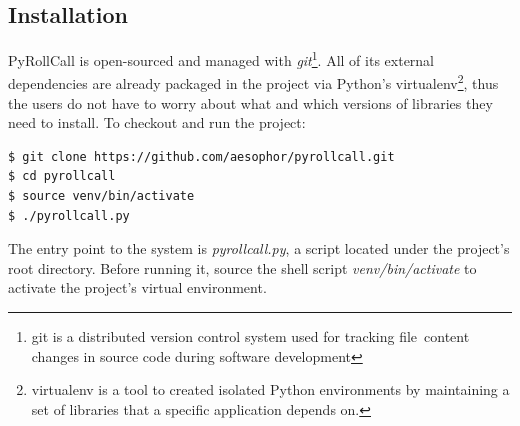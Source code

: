 \subsection{Installation}
PyRollCall is open-sourced and managed with \emph{git}\footnote{git is a distributed version control system used for tracking file\
  content changes in source code during software development}. All of its external dependencies are already packaged
in the project via Python's {virtualenv}\footnote{virtualenv is a tool to created isolated Python environments by maintaining a set of libraries that a specific application depends on.},
thus the users do not have to worry about what and which versions of libraries they need to install. To checkout and run the project:

\begin{lstlisting}[numbers=none,xleftmargin=0em,caption={Shell commands to checkout and run PyRollCall}]
$ git clone https://github.com/aesophor/pyrollcall.git
$ cd pyrollcall
$ source venv/bin/activate
$ ./pyrollcall.py 
\end{lstlisting}

The entry point to the system is \emph{pyrollcall.py}, a script located under the project's root directory.
Before running it, source the shell script \emph{venv/bin/activate} to activate the project's virtual environment.
